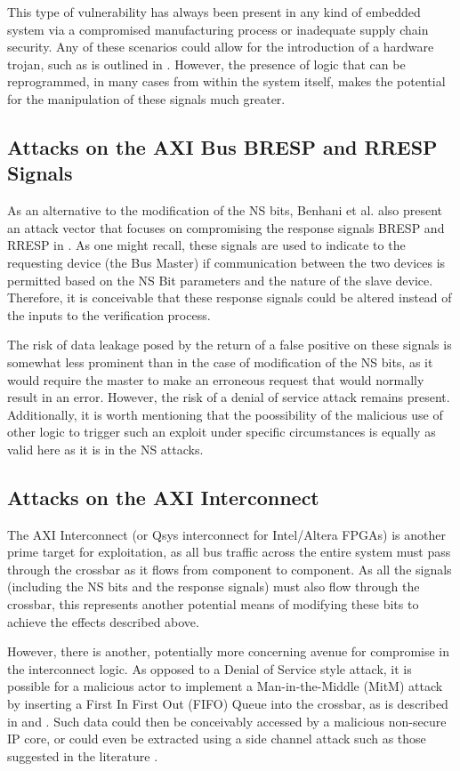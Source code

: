 \documentclass[journal]{IEEEtran}
\begin{document}
This type of vulnerability has always been present in any kind of embedded system via a
compromised manufacturing process or inadequate supply chain security. Any of these
scenarios could allow for the introduction of a hardware trojan, such as is outlined in
\cite{bhunia_hardware_2014}. However, the presence of logic that can be reprogrammed, in
many cases from within the system itself, makes the potential for the manipulation of
these signals much greater.


\subsection{Attacks on the AXI Bus BRESP and RRESP Signals}
As an alternative to the modification of the NS bits, Benhani et al. also present an
attack vector that focuses on compromising the response signals BRESP and RRESP in 
\cite{benhani_security_2019}. As one might recall, these signals are used to indicate to
the requesting device (the Bus Master) if communication between the two devices is
permitted based on the NS Bit parameters and the nature of the slave device. Therefore, it
is conceivable that these response signals could be altered instead of the inputs to the
verification process. 

The risk of data leakage posed by the return of a false positive on these signals is
somewhat less prominent than in the case of modification of the NS bits, as it would
require the master to make an erroneous request that would normally result in an error. 
However, the risk of a denial of service attack remains present. Additionally, it is worth
mentioning that the poossibility of the malicious use of other logic to trigger such an
exploit under specific circumstances is equally as valid here as it is in the NS attacks.

\subsection{Attacks on the AXI Interconnect}
The AXI Interconnect (or Qsys interconnect for Intel/Altera FPGAs) is another prime target
for exploitation, as all bus traffic across the entire system must pass through the
crossbar as it flows from component to component. As all the signals (including the NS
bits and the response signals) must also flow through the crossbar, this represents
another potential means of modifying these bits to achieve the effects described above.

However, there is another, potentially more concerning avenue for compromise in the
interconnect logic. As opposed to a Denial of Service style attack, it is possible for a
malicious actor to implement a Man-in-the-Middle (MitM) attack by inserting a First In
First Out (FIFO) Queue into the crossbar, as is described in \cite{benhani_security_2017}
and \cite{benhani_security_2019}. Such data could then be conceivably accessed by a
malicious non-secure IP core, or could even be extracted using a side channel attack such
as those suggested in the literature \cite{bukasa_how_2018}.
\end{document}
